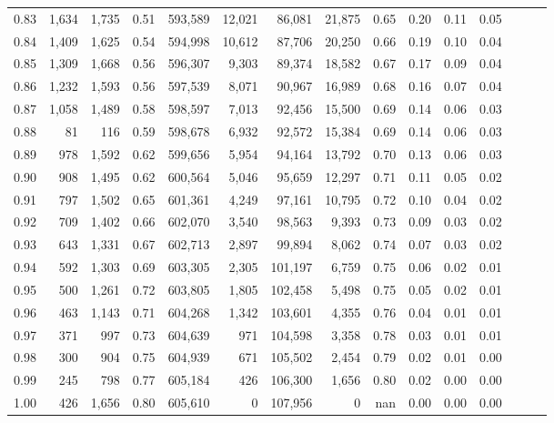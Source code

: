 \begin{tabular}{rrrrrrrrrrrrrrr}
0.83 &   1,634 &  1,735 &  0.51 &  593,589 &   12,021 &   86,081 &   21,875 &  0.65 &  0.20 &  0.11 &      0.05 \\
0.84 &   1,409 &  1,625 &  0.54 &  594,998 &   10,612 &   87,706 &   20,250 &  0.66 &  0.19 &  0.10 &      0.04 \\
0.85 &   1,309 &  1,668 &  0.56 &  596,307 &    9,303 &   89,374 &   18,582 &  0.67 &  0.17 &  0.09 &      0.04 \\
0.86 &   1,232 &  1,593 &  0.56 &  597,539 &    8,071 &   90,967 &   16,989 &  0.68 &  0.16 &  0.07 &      0.04 \\
0.87 &   1,058 &  1,489 &  0.58 &  598,597 &    7,013 &   92,456 &   15,500 &  0.69 &  0.14 &  0.06 &      0.03 \\
0.88 &      81 &    116 &  0.59 &  598,678 &    6,932 &   92,572 &   15,384 &  0.69 &  0.14 &  0.06 &      0.03 \\
0.89 &     978 &  1,592 &  0.62 &  599,656 &    5,954 &   94,164 &   13,792 &  0.70 &  0.13 &  0.06 &      0.03 \\
0.90 &     908 &  1,495 &  0.62 &  600,564 &    5,046 &   95,659 &   12,297 &  0.71 &  0.11 &  0.05 &      0.02 \\
0.91 &     797 &  1,502 &  0.65 &  601,361 &    4,249 &   97,161 &   10,795 &  0.72 &  0.10 &  0.04 &      0.02 \\
0.92 &     709 &  1,402 &  0.66 &  602,070 &    3,540 &   98,563 &    9,393 &  0.73 &  0.09 &  0.03 &      0.02 \\
0.93 &     643 &  1,331 &  0.67 &  602,713 &    2,897 &   99,894 &    8,062 &  0.74 &  0.07 &  0.03 &      0.02 \\
0.94 &     592 &  1,303 &  0.69 &  603,305 &    2,305 &  101,197 &    6,759 &  0.75 &  0.06 &  0.02 &      0.01 \\
0.95 &     500 &  1,261 &  0.72 &  603,805 &    1,805 &  102,458 &    5,498 &  0.75 &  0.05 &  0.02 &      0.01 \\
0.96 &     463 &  1,143 &  0.71 &  604,268 &    1,342 &  103,601 &    4,355 &  0.76 &  0.04 &  0.01 &      0.01 \\
0.97 &     371 &    997 &  0.73 &  604,639 &      971 &  104,598 &    3,358 &  0.78 &  0.03 &  0.01 &      0.01 \\
0.98 &     300 &    904 &  0.75 &  604,939 &      671 &  105,502 &    2,454 &  0.79 &  0.02 &  0.01 &      0.00 \\
0.99 &     245 &    798 &  0.77 &  605,184 &      426 &  106,300 &    1,656 &  0.80 &  0.02 &  0.00 &      0.00 \\
1.00 &     426 &  1,656 &  0.80 &  605,610 &        0 &  107,956 &        0 &   nan &  0.00 &  0.00 &      0.00 \\
\bottomrule
\end{tabular}
